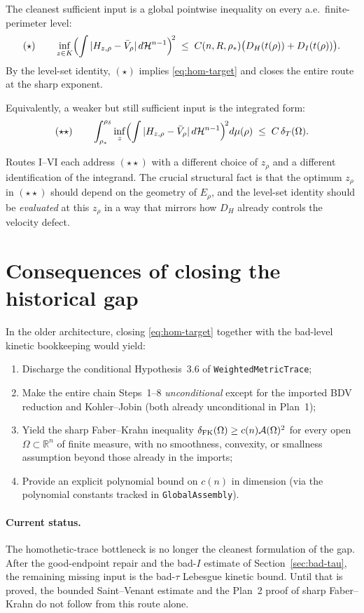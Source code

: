 \documentclass[11pt]{article}
\theoremstyle{definition}
\newcommand{\R}{\mathbb{R}}
\newcommand{\Om}{\Omega}
\newcommand{\Fr}{\mathcal{A}}
\newcommand{\rstar}{\rho_{*}}
\newcommand{\rdel}{\rho_\delta}
\newcommand{\Hn}{\mathcal H^{n-1}}
\begin{document}
The cleanest sufficient input is a global pointwise inequality on
every a.e.\ finite-perimeter level:
\[
   (\star)\qquad\inf_{z\in K}\Bigl(\int|H_{z,\rho}-\bar V_{\rho}|\,d\Hn\Bigr)^{\!2}
   \;\le\;C(n,R,\rstar)\bigl(D_{H}(t(\rho))+D_{I}(t(\rho))\bigr).
\]
By the level-set identity, $(\star)$ implies \eqref{eq:hom-target}
and closes the entire route at the sharp exponent.

Equivalently, a weaker but still sufficient input is the
integrated form:
\[
   (\star\star)\qquad
   \int_{\rstar}^{\rdel}\inf_{z}\Bigl(\int|H_{z,\rho}-\bar V_{\rho}|\,d\Hn\Bigr)^{\!2}d\mu(\rho)
   \;\le\;C\,\delta_{T}(\Om).
\]

Routes I--VI each address $(\star\star)$ with a different choice of
$z_{\rho}$ and a different identification of the integrand.  The
crucial structural fact is that the optimum $z_{\rho}$ in
$(\star\star)$ should depend on the geometry of $E_{\rho}$, and
the level-set identity should be \emph{evaluated} at this $z_{\rho}$
in a way that mirrors how $D_{H}$ already controls the velocity
defect.

\section{Consequences of closing the historical gap}\label{sec:if-closed}

In the older architecture, closing \eqref{eq:hom-target} together with
the bad-level kinetic bookkeeping would yield:
\begin{enumerate}[label=(\arabic*)]
\item Discharge the conditional Hypothesis~3.6 of \texttt{WeightedMetricTrace};
\item Make the entire chain Steps~1--8 \emph{unconditional} except
for the imported BDV reduction and Kohler--Jobin (both already
unconditional in Plan~1);
\item Yield the sharp Faber--Krahn inequality
$\delta_{\rm FK}(\Om)\ge c(n)\Fr(\Om)^{2}$ for every open
$\Om\subset\R^{n}$ of finite measure, with no smoothness, convexity,
or smallness assumption beyond those already in the imports;
\item Provide an explicit polynomial bound on $c(n)$ in dimension
(via the polynomial constants tracked in
\texttt{GlobalAssembly}).
\end{enumerate}

\paragraph{Current status.}
The homothetic-trace bottleneck is no longer the cleanest formulation
of the gap.  After the good-endpoint repair and the bad-$I$ estimate of
Section~\ref{sec:bad-tau}, the remaining missing input is the
bad-$\tau$ Lebesgue kinetic bound.  Until that is proved, the bounded
Saint--Venant estimate and the Plan~2 proof of sharp Faber--Krahn do
not follow from this route alone.
\end{document}
